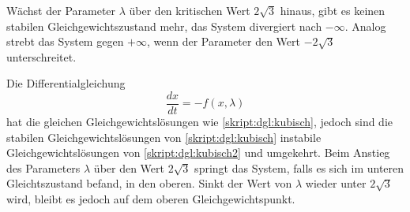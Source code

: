 Wächst der Parameter $\lambda$ über den kritischen Wert $2\!\sqrt{3}$
hinaus, gibt es keinen stabilen Gleichgewichtszustand mehr, das System
divergiert nach $-\infty$. 
Analog strebt das System gegen $+\infty$, wenn der Parameter den Wert
$-2\!\sqrt{3}$ unterschreitet.

Die Differentialgleichung 
\begin{equation}
\frac{dx}{dt}
=
-f(x,\lambda)
\label{skript:dgl:kubisch2}
\end{equation}
hat die gleichen Gleichgewichtslösungen wie \eqref{skript:dgl:kubisch},
jedoch sind die stabilen Gleichgewichtslösungen von \eqref{skript:dgl:kubisch}
instabile Gleichgewichtslösungen von \eqref{skript:dgl:kubisch2}
und umgekehrt.
Beim Anstieg des Parameters $\lambda$ über den Wert $2\!\sqrt{3}$
springt das System, falls es sich im unteren Gleichtszustand befand,
in den oberen.
Sinkt der Wert von $\lambda$ wieder unter $2\!\sqrt{3}$ wird, bleibt
es jedoch auf dem oberen Gleichgewichtspunkt.


